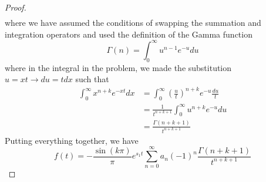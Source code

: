 \documentclass{report}
\theoremstyle{definition}
\theoremstyle{remark}
\begin{document}
\begin{proof}
\begin{equation*}
\begin{split}
        \end{split}
    \end{equation*}
    where we have assumed the conditions of swapping the summation and integration operators and used the definition of the Gamma function 
    \begin{equation*}
        \Gamma(n) = \int^\infty_0u^{n-1}e^{-u}du
    \end{equation*}
    where in the integral in the problem, we made the substitution $u=xt \rightarrow du =tdx$ such that
    \begin{equation*}
        \begin{split}
            \int^\infty_0 x^{n+k}e^{-xt}dx &= \int^\infty_0 \left( \frac{u}{t} \right)^{n+k}e^{-u}\frac{du}{t}
            \\
            &=\frac{1}{t^{n+k+1}}\int^\infty_0 u^{n+k}e^{-u}du \\
            &=\frac{\Gamma (n+k+1)}{t^{n+k+1}}
        \end{split}
    \end{equation*}
    Putting everything together, we have 
    \begin{equation*}
        f(t) = -\frac{\sin (k\pi)}{\pi}e^{s_1t}\sum^\infty_{n=0} a_n (-1)^n \frac{\Gamma (n+k+1)}{t^{n+k+1}}
    \end{equation*}
\end{proof}
\end{document}
